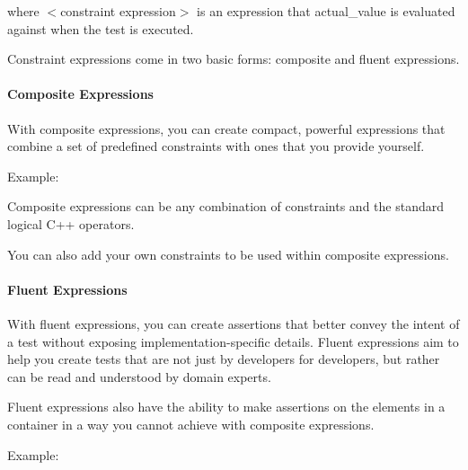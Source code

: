 where {\ttfamily $<$constraint expression$>$} is an expression that {\ttfamily actual\+\_\+value} is evaluated against when the test is executed.

Constraint expressions come in two basic forms\+: composite and fluent expressions.

\paragraph*{Composite Expressions}

With composite expressions, you can create compact, powerful expressions that combine a set of predefined constraints with ones that you provide yourself.

Example\+:


\begin{DoxyCode}{0}
\end{DoxyCode}


Composite expressions can be any combination of constraints and the standard logical C++ operators.

You can also add your own constraints to be used within composite expressions.

\paragraph*{Fluent Expressions}

With fluent expressions, you can create assertions that better convey the intent of a test without exposing implementation-\/specific details. Fluent expressions aim to help you create tests that are not just by developers for developers, but rather can be read and understood by domain experts.

Fluent expressions also have the ability to make assertions on the elements in a container in a way you cannot achieve with composite expressions.

Example\+:


\begin{DoxyCode}{0}
\end{DoxyCode}


